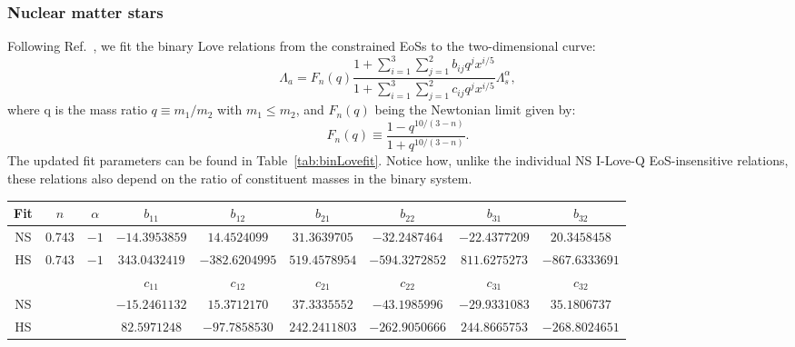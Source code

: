 \documentclass[prd,twocolumn,nofootinbib,superscriptaddress,amsmath,amssymb]{revtex4-1}
\begin{document}
\subsubsection{Nuclear matter stars}\label{sec:binLove-nuclear}
Following Ref.~\cite{Yagi:binLove}, we fit the binary Love relations from the constrained EoSs to the two-dimensional curve:
\begin{equation}\label{eq:binLovefit}
\Lambda_a=F_n(q) \frac{1+ \sum_{i=1}^3 \sum_{j=1}^2 b_{ij}q^j x^{i/5}}{1 + \sum_{i=1}^3 \sum_{j=1}^2 c_{ij}q^j x^{i/5}} \Lambda_s^{\alpha},
\end{equation}
where q is the mass ratio $q \equiv m_1/m_2$ with $m_1 \leq m_2$, and $F_n(q)$ being the Newtonian limit given by:
\begin{equation}
F_n(q) \equiv \frac{1-q^{10/(3-n)}}{1+q^{10/(3-n)}}.
\end{equation}
The updated fit parameters can be found in Table~\ref{tab:binLovefit}.
Notice how, unlike the individual NS I-Love-Q EoS-insensitive relations, these relations also depend on the ratio of constituent masses in the binary system.
\begin{table*}
\centering
\caption{
Updated fit parameters for the binary Love EoS-insensitive relations, as given by the curve found in Eq.~\ref{eq:binLovefit}.
The bottom row corresponds to separate fits corresponding to the hybrid star branch of the hybrid EoSs.
}\label{tab:binLovefit}
\addtolength{\tabcolsep}{1pt} 
\begin{tabular}{c | c  c  c  c  c  c  c  c } 
 \hline
 \hline
 Fit & $n$ & $\alpha$ & $b_{11}$ & $b_{12}$ & $b_{21}$ & $b_{22}$ & $b_{31}$ & $b_{32}$\\
 \hline
 NS & $0.743$ & $-1$ & $-14.3953859$ & $14.4524099$ & $31.3639705$ & $-32.2487464$ & $-22.4377209$ & $20.3458458$\\
 HS & $0.743$ & $-1$ & $343.0432419$ & $-382.6204995$ & $519.4578954$ & $-594.3272852$ & $811.6275273$ & $-867.6333691$\\
\hline
 \hline
 \noalign{\smallskip}

 & & & $c_{11}$ & $c_{12}$ & $c_{21}$ & $c_{22}$ & $c_{31}$ & $c_{32}$\\
 \hline
 NS & & & $-15.2461132$ & $15.3712170$ & $37.3335552$ & $-43.1985996$ & $-29.9331083$ & $35.1806737$\\
 HS & & & $82.5971248$ & $-97.7858530$ & $242.2411803$ & $-262.9050666$ & $244.8665753$ & $-268.8024651$\\
 \hline
 \hline
\end{tabular}
\addtolength{\tabcolsep}{-1pt}
\end{table*}
\end{document}
